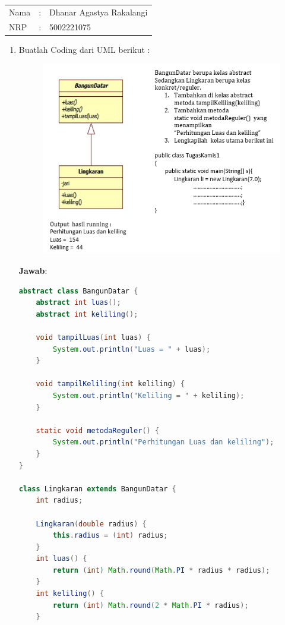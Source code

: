 \documentclass[a4paper, 12pt]{article}
\newcommand{\ans}{\textbf{Jawab}:}
\begin{document}
    \begin{tabular}{|lcl|}
     \hline
     Nama&:&Dhanar Agastya Rakalangi\\
     NRP&:&5002221075\\
     \hline
    \end{tabular}

    \begin{enumerate}
        \item Buatlah Coding dari UML berikut :
        \begin{figure}[h]
            \centering
            \includegraphics[width=1\linewidth]{No1.png}
        \end{figure}

        \newpage
        \ans
        
        \begin{lstlisting}[language=java, breaklines=true]
abstract class BangunDatar {
    abstract int luas();
    abstract int keliling();

    void tampilLuas(int luas) {
        System.out.println("Luas = " + luas);
    }

    void tampilKeliling(int keliling) {
        System.out.println("Keliling = " + keliling);
    }

    static void metodaReguler() {
        System.out.println("Perhitungan Luas dan keliling");
    }
}

class Lingkaran extends BangunDatar {
    int radius;

    Lingkaran(double radius) {
        this.radius = (int) radius;
    }
    int luas() {
        return (int) Math.round(Math.PI * radius * radius);
    }
    int keliling() {
        return (int) Math.round(2 * Math.PI * radius);
    }
    

\end{lstlisting}
\end{enumerate}
\end{document}
